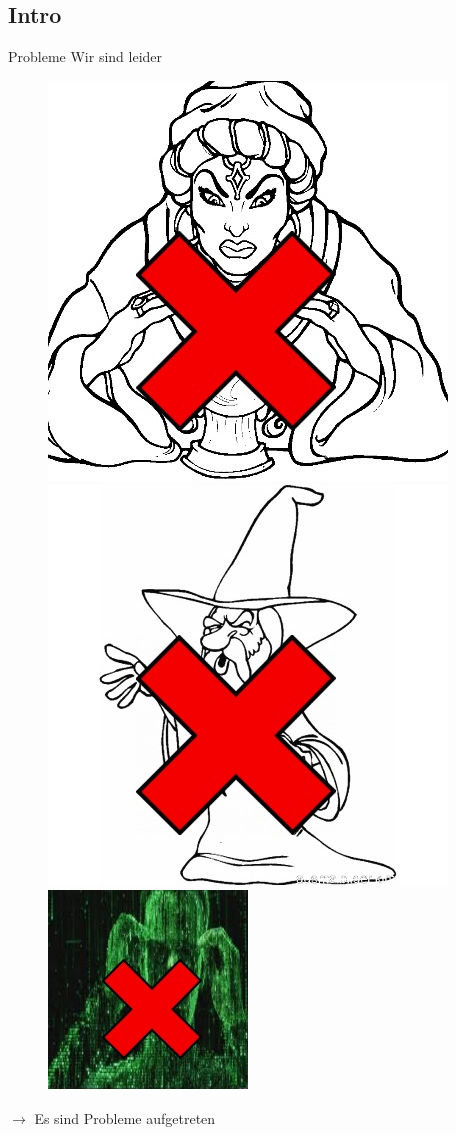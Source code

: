 \documentclass[19pt]{beamer}
\begin{document}
\subsection{Intro}
\begin{frame}{Probleme}
	Wir sind leider
	\begin{center}
        \begin{figure}
				\includegraphics[scale=0.35]{resources/Wahrsager.jpg}
				\includegraphics[scale=0.35]{resources/zauberer.jpg}
				\includegraphics[scale=0.7]{resources/Hacker.jpg}
		\end{figure}
	\end{center}
	$\rightarrow$ Es sind Probleme aufgetreten
\end{frame}
\end{document}
